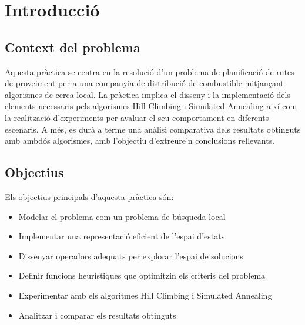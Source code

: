 \section{Introducció}
\label{sec:introduction}

\subsection{Context del problema }
Aquesta pràctica se centra en la resolució d’un problema de planificació de rutes de proveiment per a una companyia de distribució de combustible mitjançant algorismes de cerca local. La pràctica implica el disseny i la implementació dels elements necessaris pels algorismes Hill Climbing i Simulated Annealing així com la realització d’experiments per avaluar el seu comportament en diferents escenaris. A més, es durà a terme una anàlisi comparativa dels resultats obtinguts amb ambdós algorismes, amb l’objectiu d’extreure’n conclusions rellevants.

\subsection{Objectius}
Els objectius principals d'aquesta pràctica són:

\begin{itemize}
    \item Modelar el problema com un problema de búsqueda local
    \item Implementar una representació eficient de l'espai d'estats
    \item Dissenyar operadors adequats per explorar l'espai de solucions
    \item Definir funcions heurístiques que optimitzin els criteris del problema
    \item Experimentar amb els algoritmes Hill Climbing i Simulated Annealing
    \item Analitzar i comparar els resultats obtinguts
\end{itemize}
